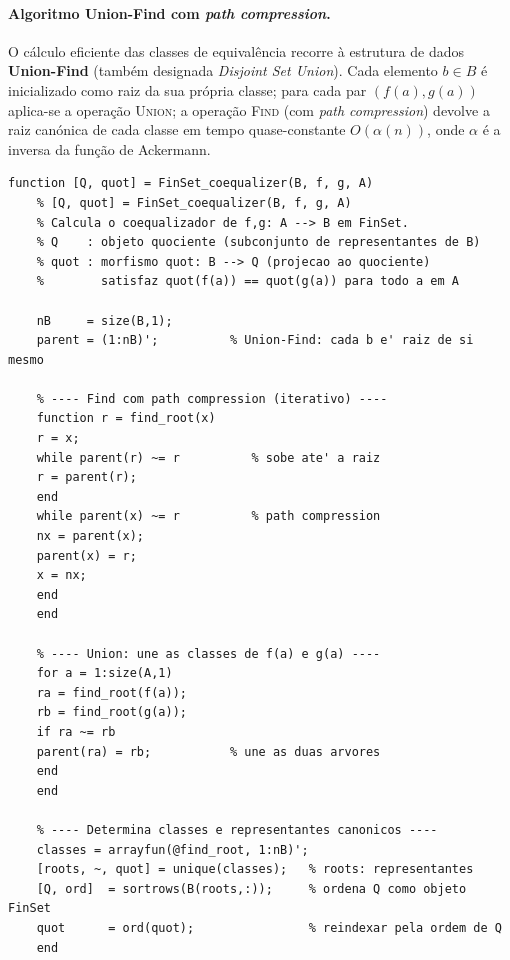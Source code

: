\paragraph{Algoritmo Union-Find com \emph{path compression}.}
O cálculo eficiente das classes de equivalência recorre à estrutura
de dados \textbf{Union-Find} (também designada \emph{Disjoint Set
	Union}). Cada elemento $b \in B$ é inicializado como raiz da sua
própria classe; para cada par $(f(a), g(a))$ aplica-se a operação
\textsc{Union}; a operação \textsc{Find} (com \emph{path
	compression}) devolve a raiz canónica de cada classe em tempo
quase-constante $O(\alpha(n))$, onde $\alpha$ é a inversa da
função de Ackermann.

\begin{lstlisting}[style=matlab, caption={Coequalizador via Union-Find com \textit{path compression}}]
	function [Q, quot] = FinSet_coequalizer(B, f, g, A)
	% [Q, quot] = FinSet_coequalizer(B, f, g, A)
	% Calcula o coequalizador de f,g: A --> B em FinSet.
	% Q    : objeto quociente (subconjunto de representantes de B)
	% quot : morfismo quot: B --> Q (projecao ao quociente)
	%        satisfaz quot(f(a)) == quot(g(a)) para todo a em A
	
	nB     = size(B,1);
	parent = (1:nB)';          % Union-Find: cada b e' raiz de si mesmo
	
	% ---- Find com path compression (iterativo) ----
	function r = find_root(x)
	r = x;
	while parent(r) ~= r          % sobe ate' a raiz
	r = parent(r);
	end
	while parent(x) ~= r          % path compression
	nx = parent(x);
	parent(x) = r;
	x = nx;
	end
	end
	
	% ---- Union: une as classes de f(a) e g(a) ----
	for a = 1:size(A,1)
	ra = find_root(f(a));
	rb = find_root(g(a));
	if ra ~= rb
	parent(ra) = rb;           % une as duas arvores
	end
	end
	
	% ---- Determina classes e representantes canonicos ----
	classes = arrayfun(@find_root, 1:nB)';
	[roots, ~, quot] = unique(classes);   % roots: representantes
	[Q, ord]  = sortrows(B(roots,:));     % ordena Q como objeto FinSet
	quot      = ord(quot);                % reindexar pela ordem de Q
	end
\end{lstlisting}


